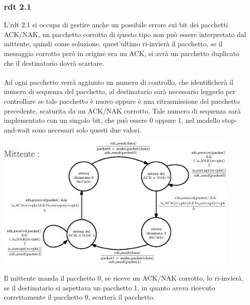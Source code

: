 \documentclass[12pt, letterpaper]{article}
\newcommand{\acc}{\\\hphantom{}\\}
\begin{document}
\subsubsection{rdt 2.1} 
L'rdt 2.1 si occupa di gestire anche un possibile errore sui bit dei pacchetti ACK/NAK, un pacchetto corrotto di questo 
tipo non può essere interpretato dal mittente, quindi come soluzione, quest'ultimo ri-invierà il pacchetto, se il messaggio 
corrotto però in origine era un ACK, si avrà un pacchetto duplicato che il destinatario dovrà scartare.\acc 
Ad ogni pacchetto verrà aggiunto un numero di controllo, che identificherà il numero di sequenza del pacchetto, al 
destinatario sarà necessario leggerlo per controllare se tale pacchetto è nuovo oppure è una ritrasmissione 
del pacchetto precedente, scaturita da un ACK/NAK corrotto. Tale numero di sequenza sarà implementato con un singolo 
bit, che può essere 0 oppure 1, nel modello stop-and-wait sono necessari solo questi due valori.\begin{center}
    \includegraphics[width=0.9\textwidth ]{images/rdt2.1.eps}
\end{center} 
Il mittente manda il pacchetto 0, se riceve un ACK/NAK corrotto, lo ri-invierà, se il destinatario si aspettava un pacchetto 
1, in quanto aveva ricevuto correttamente il pacchetto 0, scarterà il pacchetto.
\end{document}
